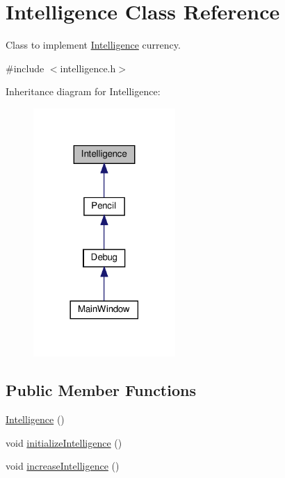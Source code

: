 \hypertarget{classIntelligence}{}\section{Intelligence Class Reference}
\label{classIntelligence}


Class to implement \hyperlink{classIntelligence}{Intelligence} currency.  




{\ttfamily \#include $<$intelligence.\+h$>$}



Inheritance diagram for Intelligence\+:
\nopagebreak
\begin{figure}[H]
\begin{center}
\leavevmode
\includegraphics[width=153pt]{classIntelligence__inherit__graph}
\end{center}
\end{figure}
\subsection*{Public Member Functions}
\begin{DoxyCompactItemize}
\item 
\hyperlink{classIntelligence_a146fc36901bb5993c71b0d9426439fea}{Intelligence} ()
\item 
void \hyperlink{classIntelligence_a7a85f46b0628c2c018a729a15f78b322}{initialize\+Intelligence} ()
\item 
void \hyperlink{classIntelligence_ad822db7ef4eef6c1f797f65c73fec3f0}{increase\+Intelligence} ()
\end{DoxyCompactItemize}
